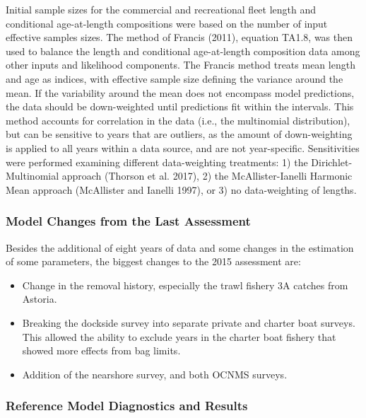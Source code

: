 \documentclass[
]{scrartcl}
\providecommand{\tightlist}{%
  \setlength{\itemsep}{0pt}\setlength{\parskip}{0pt}}\usepackage{longtable,booktabs,array}
\begin{document}
Initial sample sizes for the commercial and recreational fleet length
and conditional age-at-length compositions were based on the number of
input effective samples sizes. The method of Francis (2011), equation
TA1.8, was then used to balance the length and conditional age-at-length
composition data among other inputs and likelihood components. The
Francis method treats mean length and age as indices, with effective
sample size defining the variance around the mean. If the variability
around the mean does not encompass model predictions, the data should be
down-weighted until predictions fit within the intervals. This method
accounts for correlation in the data (i.e., the multinomial
distribution), but can be sensitive to years that are outliers, as the
amount of down-weighting is applied to all years within a data source,
and are not year-specific. Sensitivities were performed examining
different data-weighting treatments: 1) the Dirichlet-Multinomial
approach (Thorson et al. 2017), 2) the McAllister-Ianelli Harmonic Mean
approach (McAllister and Ianelli 1997), or 3) no data-weighting of
lengths.

\subsubsection{Model Changes from the Last
Assessment}\label{model-changes-from-the-last-assessment}

Besides the additional of eight years of data and some changes in the
estimation of some parameters, the biggest changes to the 2015
assessment are:

\begin{itemize}
\tightlist
\item
  Change in the removal history, especially the trawl fishery 3A catches
  from Astoria.
\item
  Breaking the dockside survey into separate private and charter boat
  surveys. This allowed the ability to exclude years in the charter boat
  fishery that showed more effects from bag limits.
\item
  Addition of the nearshore survey, and both OCNMS surveys.
\end{itemize}

\newpage{}

\subsubsection{Reference Model Diagnostics and
Results}\label{reference-model-diagnostics-and-results}
\end{document}
